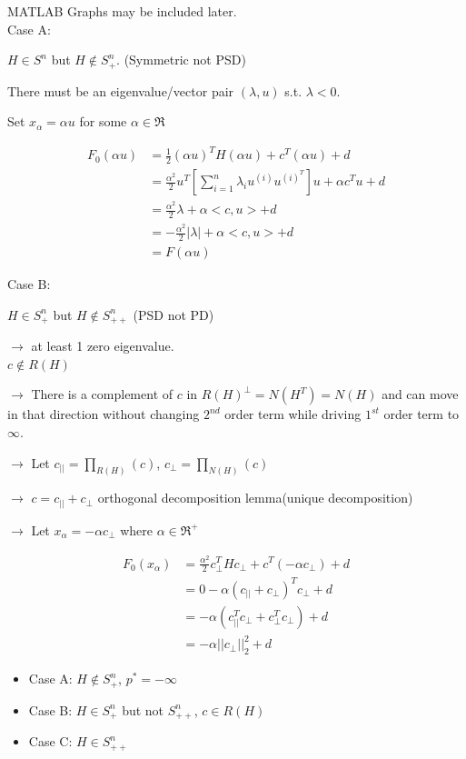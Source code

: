 MATLAB Graphs may be included later.\\

Case A: 

$H\in S^n$ but $H\notin S^n_+$. (Symmetric not PSD)

There must be an eigenvalue/vector pair $(\lambda, u)$ s.t. $\lambda < 0$.

Set $x_{\alpha} = \alpha u$ for some $\alpha \in \Re$

\begin{align*}
F_0(\alpha u) &= \frac{1}{2}(\alpha u)^TH(\alpha u) + c^T(\alpha u) + d\\
&= \frac{{\alpha}^2}{2} u^T[\sum^n_{i=1}\lambda_i u^{(i)} u^{(i)^T}]u + \alpha c^Tu + d\\
&= \frac{{\alpha}^2}{2}\lambda + \alpha <c,u> + d\\
&= -\frac{{\alpha}^2}{2}|\lambda| + \alpha<c,u> + d\\
&= F(\alpha u)
\end{align*}


Case B: 

$H\in S_+^n$ but $H\notin S^n_{++}$ (PSD not PD)

$\rightarrow$ at least 1 zero eigenvalue.\\

$c \notin R(H)$

$\rightarrow$ There is a complement of $c$ in $R(H)^{\perp} = N(H^T) = N(H)$ and can move in that direction without changing $2^{nd}$ order term while driving $1^{st} $ order term to $\infty$.

$\rightarrow$ Let $c_{||} = \prod_{R(H)}(c)$, $c_{\perp} = \prod_{N(H)}(c)$

$\rightarrow$ $c = c_{||} + c_{\perp}$ orthogonal decomposition lemma(unique decomposition)

$\rightarrow$ Let $x_{\alpha} =-\alpha c_{\perp}$ where $\alpha \in \Re^+$

\begin{align*}
F_0(x_{\alpha}) &=\frac{{\alpha}^2}{2}c_{\perp}^THc_{\perp} + c^T(-\alpha c_{\perp}) + d\\
&= 0 - \alpha(c_{||} + c_{\perp})^Tc_{\perp} + d\\
&= -\alpha(c_{||}^Tc_{\perp} + c_{\perp}^Tc_{\perp}) + d\\
&= -\alpha||c_{\perp}||^2_2 + d
\end{align*}

\begin{itemize}
	\item Case A: $H\notin S^n_+$, $p^* = -\infty$
	
	\item Case B: $H\in S^n_+$ but not $S^n_{++}$, $c\in R(H)$
	
	\item Case C: $H\in S^n_{++}$
\end{itemize}

